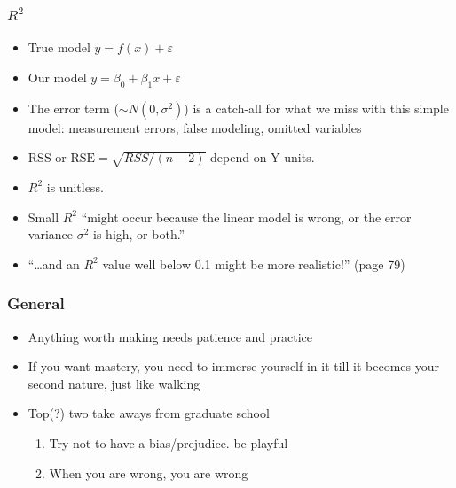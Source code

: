 \documentclass[serif, xcolor={dvipsnames}]{beamer} %
\newcommand\dangersign[1][2ex]{%
  \renewcommand\stacktype{L}%
  \scaleto{\stackon[1.3pt]{\color{red}$\triangle$}{\tiny !}}{#1}%
}
\newcommand{\Rq}{{\faSearch~}}
\begin{document}


\begin{frame}[t]
\frametitle{$R^2$}
\begin{itemize}[<+->]
\item True model $ y = f(x) + \varepsilon$\\
\item Our model $ y = \beta_0 + \beta_1x + \varepsilon$\\
\item The error term ($\sim N(0, \sigma^2)$) is a catch-all for what we miss with this
simple model: measurement errors, false modeling, omitted variables

\item RSS or $\text{RSE} = \sqrt{RSS/(n-2)}$ depend on Y-units. 

\item $R^2$ is unitless.

\item Small $R^2$ ``might occur because the linear model is wrong, or the error variance $\sigma^2$ is high, or both.''

\item ``\dots  and an $R^2$ value well below 0.1 might be more realistic!'' (page 79)
\end{itemize}
\end{frame}
\begin{frame}
\frametitle{General}

\begin{itemize}
\item Anything worth making needs patience and practice
\item If you want mastery, you need to immerse yourself in it till it becomes your second nature, just like walking

\vspace{.5in}
\item Top(?) two take aways from graduate school
\begin{enumerate}
\item Try not to have a bias/prejudice. be playful \Rq
\item When you are wrong, you are wrong \dangersign
\end{enumerate}
\end{itemize}
\end{frame}
\end{document}

